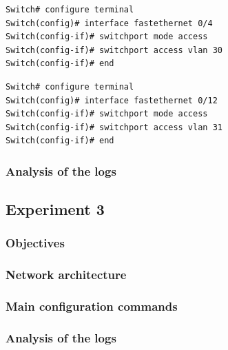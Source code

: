 \documentclass[a4paper,11pt,english]{article}
\begin{document}
\begin{lstlisting}[caption=Adding port 4 to VLAN30]
Switch# configure terminal
Switch(config)# interface fastethernet 0/4
Switch(config-if)# switchport mode access
Switch(config-if)# switchport access vlan 30
Switch(config-if)# end
\end{lstlisting}

\begin{lstlisting}[caption=Adding port 12 to VLAN31]
Switch# configure terminal
Switch(config)# interface fastethernet 0/12
Switch(config-if)# switchport mode access
Switch(config-if)# switchport access vlan 31
Switch(config-if)# end
\end{lstlisting}



        \subsubsection{Analysis of the logs}


    \subsection{Experiment 3}
        \subsubsection{Objectives}

        \subsubsection{Network architecture}

        \subsubsection{Main configuration commands}

        \subsubsection{Analysis of the logs}


\end{document}
